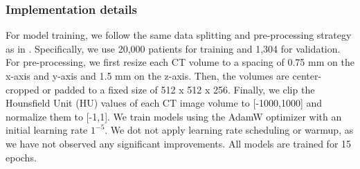 

\subsubsection*{Implementation details}

For model training, we follow the same data splitting and pre-processing strategy as in \cite{hamamci2024foundation}. Specifically, we use 20,000 patients for training and 1,304 for validation. For pre-processing, we first resize each CT volume to a spacing of 0.75 mm on the x-axis and y-axis and 1.5 mm on the z-axis. Then, the volumes are center-cropped or padded to a fixed size of 512 x 512 x 256. Finally, we clip the Hounsfield Unit (HU) values of each CT image volume to [-1000,1000] and normalize them to [-1,1].  We train models using the AdamW optimizer \cite{kingma2014adam} with an initial learning rate $1^{-5}$. We dot not apply learning rate scheduling or warmup, as we have not observed any significant improvements. All models are trained for 15 epochs.


